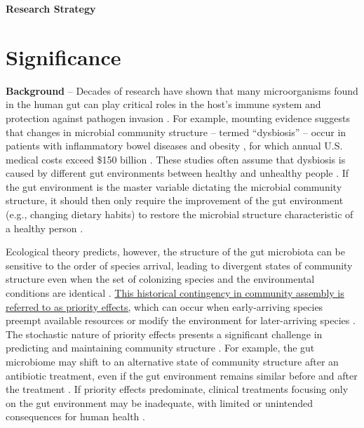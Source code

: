 \documentclass[12pt, class=article, crop=false]{standalone}
\begin{document}
\textbf{Research Strategy}

\section{Significance}

\textbf{Background} --
Decades of research have shown that many microorganisms found in the human gut can play critical roles in the host's immune system and protection against pathogen invasion \citep{fierer_animalcules_2012, petersen_defining_2014, turroni_infant_2020}.
For example, mounting evidence suggests that changes in microbial community structure -- termed ``dysbiosis'' -- occur in patients with inflammatory bowel diseases \citep{frank_molecular-phylogenetic_2007, karlsson_gut_2013, abrahamsson_low_2014, parracho_differences_2005} and obesity \citep{costello_application_2012, ley_obesity_2005, turnbaugh_diet-induced_2008}, for which annual U.S. medical costs exceed \$150 billion \citep{singh_trends_2022, cawley_medical_2012}.
These studies often assume that dysbiosis is caused by different gut environments between healthy and unhealthy people \citep{fierer_animalcules_2012, petersen_defining_2014}.
If the gut environment is the master variable dictating the microbial community structure, it should then only require the improvement of the gut environment (e.g., changing dietary habits) to restore the microbial structure characteristic of a healthy person \citep{chase_community_2003, leibold_metacommunity_2004, fukami_historical_2015, hooper_how_2002, reese_thinking_2019}.

Ecological theory predicts, however, the structure of the gut microbiota can be sensitive to the order of species arrival, leading to divergent states of community structure even when the set of colonizing species and the environmental conditions are identical \citep{fierer_animalcules_2012, david_host_2014, akagawa_effect_2019, ojima_priority_2022, debray_priority_2022}.
\ul{This historical contingency in community assembly is referred to as priority effects,} which can occur when early-arriving species preempt available resources or modify the environment for later-arriving species \citep{fukami_historical_2015, ke_coexistence_2018}.
The stochastic nature of priority effects presents a significant challenge in predicting and maintaining community structure \citep{fukami_historical_2015}.
For example, the gut microbiome may shift to an alternative state of community structure after an antibiotic treatment, even if the gut environment remains similar before and after the treatment \citep{dethlefsen_incomplete_2011, jakobsson_short-term_2010}.
If priority effects predominate, clinical treatments focusing only on the gut environment may be inadequate, with limited or unintended consequences for human health \citep{fierer_animalcules_2012}.
\end{document}

